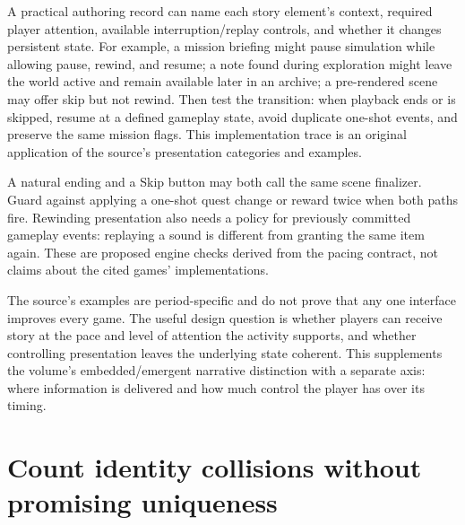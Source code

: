 A practical authoring record can name each story element's context, required player attention, available interruption/replay controls, and whether it changes persistent state. For example, a mission briefing might pause simulation while allowing pause, rewind, and resume; a note found during exploration might leave the world active and remain available later in an archive; a pre-rendered scene may offer skip but not rewind. Then test the transition: when playback ends or is skipped, resume at a defined gameplay state, avoid duplicate one-shot events, and preserve the same mission flags. This implementation trace is an original application of the source's presentation categories and examples.

A natural ending and a Skip button may both call the same scene finalizer. Guard against applying a one-shot quest change or reward twice when both paths fire. Rewinding presentation also needs a policy for previously committed gameplay events: replaying a sound is different from granting the same item again. These are proposed engine checks derived from the pacing contract, not claims about the cited games' implementations.

The source's examples are period-specific and do not prove that any one interface improves every game. The useful design question is whether players can receive story at the pace and level of attention the activity supports, and whether controlling presentation leaves the underlying state coherent. This supplements the volume's embedded/emergent narrative distinction with a separate axis: where information is delivered and how much control the player has over its timing.

\section{Count identity collisions without promising uniqueness}\label{06-engine-ii-ch047-count-identity-collisions-without-promising-uniqueness}

